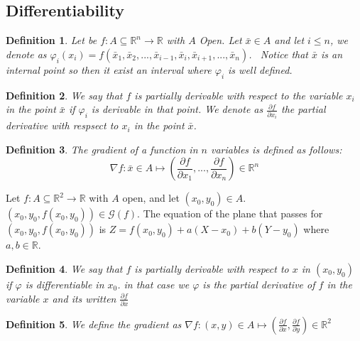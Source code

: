 \documentclass{article}
\newtheorem{definition}{Definition}
\begin{document}
    \subsection*{Differentiability}
    \begin{definition}
        Let be $f : A \subseteq \mathbb{R}^n \rightarrow \mathbb{R}$ with $A$ Open.
        Let $\bar{x} \in A$ and let $i \leq n$, we denote as $\varphi_i(x_i) = f(\bar{x}_1, \bar{x}_2, ... ,\bar{x}_{i-1},\bar{x}_i, \bar{x}_{i+1}, ... , \bar{x}_n)$. \
        Notice that $\bar{x}$ is an internal point so then it exist an interval where $\varphi_i$ is well defined. 
    \end{definition}
    \begin{definition}
        We say that $f$ is partially derivable with respect to the variable $x_i$ in the point $\bar{x}$ if $\varphi_i$ is derivable in that point.
        We denote as $\frac{\partial f}{\partial x_i}$ the partial derivative with respsect to $x_i$ in the point $\bar{x}$. 
    \end{definition}
    \begin{definition}
        The gradient of a function in $n$ variables is defined as follows:
        \begin{equation*}
            \nabla f : \bar{x} \in A \longmapsto  \left( \frac{\partial f}{\partial x_1},..., \frac{\partial f}{\partial x_n} \right)  \in \mathbb{R}^n
        \end{equation*}
    \end{definition}
    Let $f : A \subseteq \mathbb{R}^2 \rightarrow \mathbb{R}$ with $A$ open, and let $(x_0,y_0) \in A$. \\ $(x_0,y_0, f(x_0,y_0)) \in \mathcal{G}(f)$. The equation of the plane that passes for \\ $(x_0,y_0, f(x_0,y_0))$ is $Z = f(x_0,y_0) + a(X-x_0) + b(Y-y_0)$ where $a,b \in \mathbb{R}$.
    \begin{definition}
        We say that $f$ is partially derivable with respect to $x$ in $(x_0,y_0)$ if $\varphi$ is differentiable in $x_0$.
        in that case we $\varphi$ is the partial derivative of $f$ in the variable $x$ and its written $\frac{\partial f}{\partial x}$ 
    \end{definition}
    \begin{definition}
        We define the gradient as $\nabla f : (x,y) \in A \longmapsto \left( \frac{\partial f}{\partial x},\frac{\partial f}{\partial y} \right) \in \mathbb{R}^2$
    \end{definition}
\end{document}
